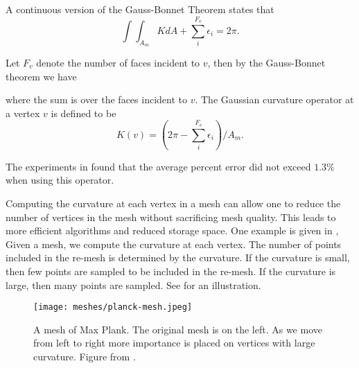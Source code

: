 A continuous version of the Gauss-Bonnet Theorem
states that 
$$\int \int_{A_m}K dA +\sum_i^{F_v} \epsilon_i=2\pi.$$

Let $F_v$ denote the number of faces incident to $v$, 
then by the Gauss-Bonnet theorem we have


where the sum is over the faces incident to $v$.
The Gaussian curvature operator at a vertex $v$ is defined
to be
$$K(v)=\left( 2\pi -\sum_i^{F_v}\epsilon_i\right)/ A_m.$$

The experiments in \cite{mmsb-2003} found that the average
percent error did not exceed $1.3\%$ when using this operator.

Computing the curvature at each vertex in a mesh can allow one to reduce
the number of vertices in the mesh without sacrificing mesh quality.
This leads to more efficient algorithms and reduced storage space.
One example is given in \cite{alliez-2002},
Given a mesh, we compute the curvature at each vertex.
The number of points included in the re-mesh is determined
by the curvature. If the curvature is small, then few points
are sampled to be included in the re-mesh. If the curvature
is large, then many points are sampled. See 
for an illustration.

\begin{figure}[htb]
\centering
\texttt{[image: meshes/planck-mesh.jpeg]}
\caption{A mesh of Max Plank. The original mesh is on the left. As we move
from left to right more importance is placed on vertices with large curvature.
Figure from \cite{alliez-2002}.}
\label{fig:planck-mesh}
\end{figure}